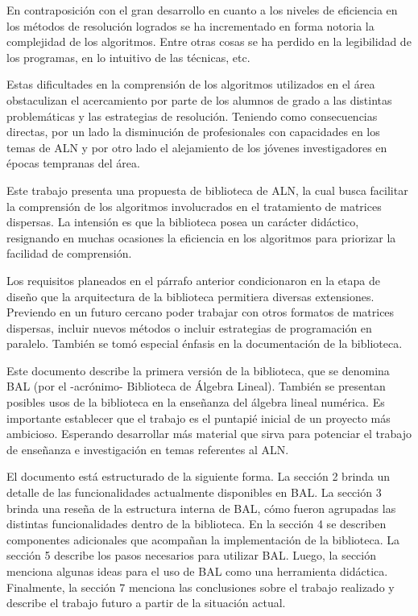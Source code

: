 \documentclass[a4paper,10pt]{article}
\begin{document}
 En contraposición con el gran desarrollo en cuanto a los niveles de eficiencia en los métodos de resolución logrados se ha incrementado en forma notoria la complejidad de los algoritmos. 
 Entre otras cosas se ha perdido en  la legibilidad de los programas, en lo intuitivo de las técnicas, etc.

 Estas dificultades en la comprensión de los algoritmos utilizados en el área obstaculizan el acercamiento por parte de los alumnos de grado a las distintas problemáticas y las estrategias de resolución. 
 Teniendo como consecuencias directas, por un lado la disminución de profesionales con capacidades en los temas de ALN y por otro lado el alejamiento de los jóvenes investigadores en épocas tempranas del área.

 Este trabajo presenta una propuesta de biblioteca de ALN, la cual busca facilitar la comprensión de los algoritmos involucrados en el tratamiento de matrices dispersas.
 La intensión es que la biblioteca posea un carácter didáctico, resignando en muchas ocasiones la eficiencia en los algoritmos para priorizar la facilidad de comprensión.

 Los requisitos planeados en el párrafo anterior condicionaron en la etapa de diseño que la arquitectura de la biblioteca permitiera diversas extensiones.
 Previendo en un futuro cercano poder trabajar con otros formatos de matrices dispersas, incluir nuevos métodos o incluir estrategias de programación en paralelo. 
 También se tomó especial énfasis en la documentación de la biblioteca.

 Este documento describe la primera versión de la biblioteca, que se denomina BAL (por el -acrónimo- Biblioteca de Álgebra Lineal).
 También se presentan posibles usos de la biblioteca en la enseñanza del álgebra lineal numérica. 
 Es importante establecer que el trabajo es el puntapié inicial de un proyecto más ambicioso. 
 Esperando desarrollar más material que sirva para potenciar el trabajo de enseñanza e investigación en temas referentes al ALN.


 El documento está estructurado de la siguiente forma. La sección 2 brinda un detalle de las funcionalidades actualmente disponibles en BAL. 
La sección 3 brinda una reseña de la estructura interna de BAL, cómo fueron agrupadas las distintas funcionalidades dentro de la biblioteca.
 En la sección 4 se describen componentes adicionales que acompañan la implementación de la biblioteca. 
 La sección 5 describe los pasos necesarios para utilizar BAL.
 Luego, la sección menciona algunas ideas para el uso de BAL como una herramienta didáctica.  
Finalmente, la sección 7 menciona las conclusiones sobre el trabajo realizado y describe el trabajo futuro a partir de la situación actual.
\end{document}
